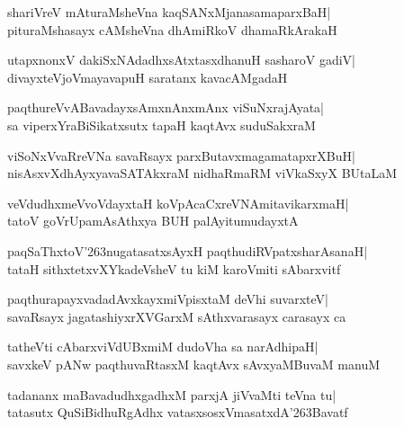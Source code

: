 \documentclass[twoside,12pt,openright]{book}
\def\S{\char'263}
\newcounter{shloka}[chapter]
\begin{document}
\begin{shloka}%
shariVreV mAturaMsheVna kaqSANxMjanasamaparxBaH|\\
pituraMshasayx cAMsheVna dhAmiRkoV dhamaRkArakaH
\end{shloka}

\begin{shloka}%
utapxnonxV dakiSxNAdadhxsAtxtasxdhanuH sasharoV gadiV|\\
divayxteVjoVmayavapuH saratanx kavacAMgadaH
\end{shloka}

\begin{shloka}%
paqthureVvABavadayxsAmxnAnxmAnx viSuNxrajAyata|\\
sa viperxYraBiSikatxsutx tapaH kaqtAvx suduSakxraM
\end{shloka}

\begin{shloka}%
viSoNxVvaRreVNa savaRsayx parxButavxmagamatapxrXBuH|\\
nisAsxvXdhAyxyavaSATAkxraM nidhaRmaRM viVkaSxyX BUtaLaM
\end{shloka}

\begin{shloka}%
veVdudhxmeVvoVdayxtaH koVpAcaCxreVNAmitavikarxmaH|\\
tatoV goVrUpamAsAthxya BUH palAyitumudayxtA
\end{shloka}

\begin{shloka}%
paqSaThxtoV\S nugatasatxsAyxH paqthudiRVpatxsharAsanaH|\\
tataH sithxtetxvXYkadeVsheV tu kiM karoVmiti sAbarxvitf
\end{shloka}

\begin{shloka}%
paqthurapayxvadadAvxkayxmiVpisxtaM deVhi suvarxteV|\\
savaRsayx jagatashiyxrXVGarxM sAthxvarasayx carasayx ca
\end{shloka}

\begin{shloka}%
tatheVti cAbarxviVdUBxmiM dudoVha sa narAdhipaH|\\
savxkeV pANw paqthuvaRtasxM kaqtAvx sAvxyaMBuvaM manuM
\end{shloka}

\begin{shloka}%
tadananx maBavadudhxgadhxM parxjA jiVvaMti teVna tu|\\
tatasutx QuSiBidhuRgAdhx vatasxsosxVmasatxdA\S Bavatf
\end{shloka}
\end{document}
